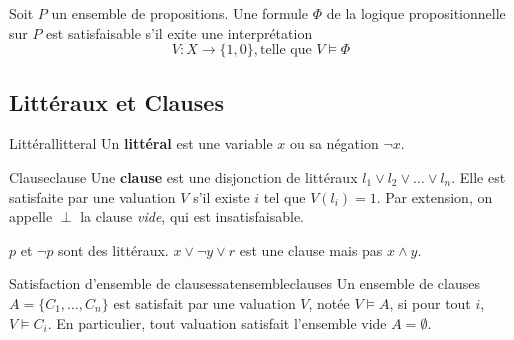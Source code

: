 \begin{remark}
    Soit $P$ un ensemble de propositions. Une formule $\Phi$ de la logique propositionnelle sur $P$ est satisfaisable s'il exite une interprétation
    \begin{equation*}
        V : X \rightarrow \{1, 0\}, \text{telle que } V \models \Phi
    \end{equation*}
\end{remark}
\subsection{Littéraux et Clauses}
\begin{definition}{Littéral}{litteral}
    Un \textbf{littéral} est une variable $x$ ou sa négation $\neg x$.
\end{definition}
\begin{definition}{Clause}{clause}
    Une \textbf{clause} est une disjonction de littéraux $l_1 \vee l_2 \vee \dots \vee l_n$. Elle est satisfaite par une valuation $V$ s'il existe $i$ tel que $V(l_i) = 1$. Par extension, on appelle $\perp$ la clause
    \textit{vide}, qui est insatisfaisable.
\end{definition}
\begin{example}
    $p$ et $\neg p$ sont des littéraux. $x \vee\neg y \vee r$ est une clause mais pas $x \wedge y$.
\end{example}
\begin{theorem}{Satisfaction d'ensemble de clauses}{satensembleclauses}
    Un ensemble de clauses $A = \{C_1, \dots, C_n\}$ est satisfait par une valuation $V$, notée $V \models A$, si pour tout $i$, $V \models C_i$. En particulier, tout valuation satisfait l'ensemble vide $A = \emptyset$.
\end{theorem}
